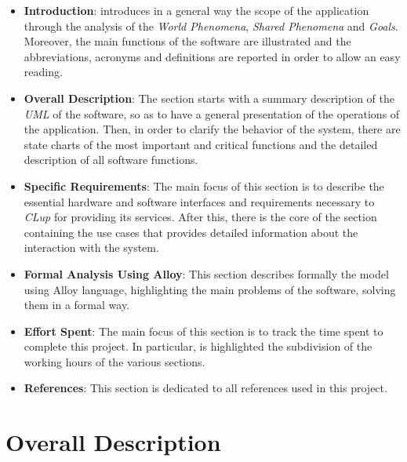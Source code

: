 \documentclass{article}
\begin{document}
	\begin{itemize}
		
		\item {\bfseries Introduction}: introduces in a general way the scope of the application through the analysis of the \emph{World Phenomena}, \emph{Shared Phenomena} and \emph{Goals}. Moreover, the main functions of the software are illustrated and the abbreviations, acronyms and definitions are reported in order to allow an easy reading.
		
		\item {\bfseries Overall Description}: The section starts with a summary description of the \emph{UML} of the software, so as to have a general presentation of the operations of the application. Then, in order to clarify the behavior of the system, there are state charts of the most important and critical functions and the detailed description of all software functions. 
		
		\item {\bfseries Specific Requirements}: The main focus of this section is to describe the essential hardware and software interfaces and requirements necessary to \emph{CLup} for providing its services. After this, there is the core of the section containing the use cases that provides detailed information about the interaction with the system.
		
		\item {\bfseries Formal Analysis Using Alloy}: This section describes formally the model using Alloy language, highlighting the main problems of the software, solving them in a formal way.
		
		\item {\bfseries Effort Spent}: The main focus of this section is to track the time spent to complete this project. In particular, is highlighted the subdivision of the working hours of the various sections.
		
		\item {\bfseries References}: This section is dedicated to all references used in this project.
		
	\end{itemize}
	
\newpage	

\section{Overall Description}
\end{document}
